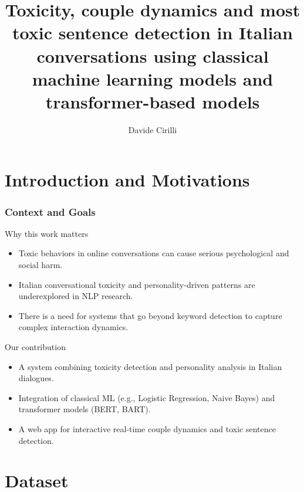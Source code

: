 \documentclass{beamer}
\title{Toxicity, couple dynamics and most toxic sentence detection in Italian conversations using classical machine learning models and transformer-based models}
\author{Davide Cirilli}
\institute{Università degli Studi di Bari Aldo Moro}
\date{}
\begin{document}
\frame{\titlepage}

\section{Introduction and Motivations}

\begin{frame}
\frametitle{Context and Goals}

\begin{block}{Why this work matters}
\begin{itemize}
\item Toxic behaviors in online conversations can cause serious psychological and social harm.
\item Italian conversational toxicity and personality-driven patterns are underexplored in NLP research.
\item There is a need for systems that go beyond keyword detection to capture complex interaction dynamics.
\end{itemize}
\end{block}

\begin{block}{Our contribution}
\begin{itemize}
\item A system combining toxicity detection and personality analysis in Italian dialogues.
\item Integration of classical ML (e.g., Logistic Regression, Naive Bayes) and transformer models (BERT, BART).
\item A web app for interactive real-time couple dynamics and toxic sentence detection.
\end{itemize}
\end{block}

\end{frame}

\section{Dataset}
\end{document}

